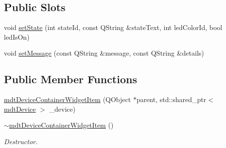 \subsection*{Public Slots}
\begin{DoxyCompactItemize}
\item 
void \hyperlink{classmdt_device_container_widget_private_1_1mdt_device_container_widget_item_a32b7de5ce79a78f6467ae0a6709ec639}{set\-State} (int state\-Id, const Q\-String \&state\-Text, int led\-Color\-Id, bool led\-Is\-On)
\item 
void \hyperlink{classmdt_device_container_widget_private_1_1mdt_device_container_widget_item_addae6dbcc3a22c35d3dddbef53393182}{set\-Message} (const Q\-String \&message, const Q\-String \&details)
\end{DoxyCompactItemize}
\subsection*{Public Member Functions}
\begin{DoxyCompactItemize}
\item 
\hyperlink{classmdt_device_container_widget_private_1_1mdt_device_container_widget_item_a6d0934e0675ea7bfe1a3d4b3e5e28e68}{mdt\-Device\-Container\-Widget\-Item} (Q\-Object $\ast$parent, std\-::shared\-\_\-ptr$<$ \hyperlink{classmdt_device}{mdt\-Device} $>$ \-\_\-device)
\item 
\hyperlink{classmdt_device_container_widget_private_1_1mdt_device_container_widget_item_a2c816807e58d3f127a7a9757020db828}{$\sim$mdt\-Device\-Container\-Widget\-Item} ()
\begin{DoxyCompactList}\small\item\em Destructor. \end{DoxyCompactList}\end{DoxyCompactItemize}
